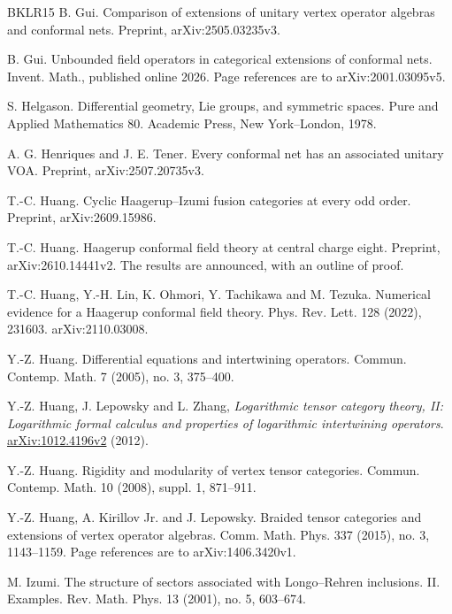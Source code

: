 \documentclass[leqno]{article}
\numberwithin{equation}{section}
\begin{document}
\begin{thebibliography}{BKLR15}
B. Gui.
\newblock Comparison of extensions of unitary vertex operator algebras and conformal nets.
\newblock Preprint, arXiv:2505.03235v3.

B. Gui.
\newblock Unbounded field operators in categorical extensions of conformal nets.
\newblock Invent. Math., published online 2026. Page references are to arXiv:2001.03095v5.

S. Helgason.
\newblock Differential geometry, Lie groups, and symmetric spaces.
\newblock Pure and Applied Mathematics 80. Academic Press, New York--London, 1978.

A. G. Henriques and J. E. Tener.
\newblock Every conformal net has an associated unitary VOA.
\newblock Preprint, arXiv:2507.20735v3.

T.-C. Huang.
\newblock Cyclic Haagerup--Izumi fusion categories at every odd order.
\newblock Preprint, arXiv:2609.15986.

T.-C. Huang.
\newblock Haagerup conformal field theory at central charge eight.
\newblock Preprint, arXiv:2610.14441v2. The results are announced, with an outline of proof.

T.-C. Huang, Y.-H. Lin, K. Ohmori, Y. Tachikawa and M. Tezuka.
\newblock Numerical evidence for a Haagerup conformal field theory.
\newblock Phys. Rev. Lett. 128 (2022), 231603. arXiv:2110.03008.

Y.-Z. Huang.
\newblock Differential equations and intertwining operators.
\newblock Commun. Contemp. Math. 7 (2005), no. 3, 375--400.

Y.-Z. Huang, J. Lepowsky and L. Zhang,
\newblock \emph{Logarithmic tensor category theory, II: Logarithmic formal calculus and properties of logarithmic intertwining operators}.
\newblock \href{https://arxiv.org/abs/1012.4196v2}{arXiv:1012.4196v2} (2012).

Y.-Z. Huang.
\newblock Rigidity and modularity of vertex tensor categories.
\newblock Commun. Contemp. Math. 10 (2008), suppl. 1, 871--911.

Y.-Z. Huang, A. Kirillov Jr. and J. Lepowsky.
\newblock Braided tensor categories and extensions of vertex operator algebras.
\newblock Comm. Math. Phys. 337 (2015), no. 3, 1143--1159. Page references are to arXiv:1406.3420v1.

M. Izumi.
\newblock The structure of sectors associated with Longo--Rehren inclusions. II. Examples.
\newblock Rev. Math. Phys. 13 (2001), no. 5, 603--674.


\end{thebibliography}
\end{document}
